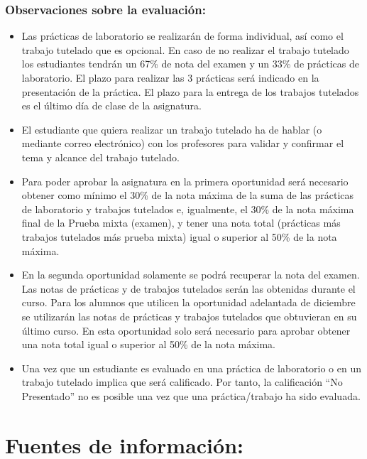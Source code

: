 \documentclass[]{book}
\begin{document}
\hypertarget{observaciones-sobre-la-evaluacion}{%
\subsubsection{Observaciones sobre la evaluación:}\label{observaciones-sobre-la-evaluacion}}

\begin{itemize}
\item
  Las prácticas de laboratorio se realizarán de forma individual, así como el trabajo tutelado que es opcional. En caso de no realizar el trabajo tutelado los estudiantes tendrán un 67\% de nota del examen y un 33\% de prácticas de laboratorio. El plazo para realizar las 3 prácticas será indicado en la presentación de la práctica. El plazo para la entrega de los trabajos tutelados es el último día de clase de la asignatura.
\item
  El estudiante que quiera realizar un trabajo tutelado ha de hablar (o mediante correo electrónico) con los profesores para validar y confirmar el tema y alcance del trabajo tutelado.
\item
  Para poder aprobar la asignatura en la primera oportunidad será necesario obtener como mínimo el 30\% de la nota máxima de la suma de las prácticas de laboratorio y trabajos tutelados e, igualmente, el 30\% de la nota máxima final de la Prueba mixta (examen), y tener una nota total (prácticas más trabajos tutelados más prueba mixta) igual o superior al 50\% de la nota máxima.
\item
  En la segunda oportunidad solamente se podrá recuperar la nota del examen. Las notas de prácticas y de trabajos tutelados serán las obtenidas durante el curso. Para los alumnos que utilicen la oportunidad adelantada de diciembre se utilizarán las notas de prácticas y trabajos tutelados que obtuvieran en su último curso. En esta oportunidad solo será necesario para aprobar obtener una nota total igual o superior al 50\% de la nota máxima.
\item
  Una vez que un estudiante es evaluado en una práctica de laboratorio o en un trabajo tutelado implica que será calificado. Por tanto, la calificación ``No Presentado'' no es posible una vez que una práctica/trabajo ha sido evaluada.
\end{itemize}

\hypertarget{fuentes-de-informacion}{%
\section{Fuentes de información:}\label{fuentes-de-informacion}}
\end{document}
